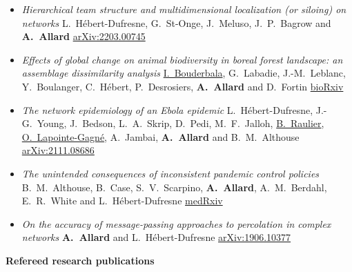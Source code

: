 \documentclass[11pt]{article}
\begin{document}
\begin{itemize}[itemsep=0.5em]
  \item \textit{Hierarchical team structure and multidimensional localization (or siloing) on networks}\split
  L.~Hébert-Dufresne, G.~St-Onge, J.~Meluso, J.~P.~Bagrow and \textbf{A.~Allard}\split
  \href{https://arxiv.org/abs/2203.00745}{arXiv:2203.00745}
%
  \item \textit{Effects of global change on animal biodiversity in boreal forest landscape: an assemblage dissimilarity analysis}\split
  \uline{I.~Bouderbala}, G.~Labadie, J.-M.~Leblanc, Y.~Boulanger, C.~Hébert, P.~Desrosiers, \textbf{A.~Allard} and D.~Fortin\split
  \href{https://doi.org/10.1101/2022.01.31.477297}{bioRxiv}
%
  \item \textit{The network epidemiology of an Ebola epidemic}\split
  L.~Hébert-Dufresne, J.-G.~Young, J.~Bedson, L.~A.~Skrip, D.~Pedi, M.~F.~Jalloh, \uline{B.~Raulier}, \uline{O.~Lapointe-Gagné}, A.~Jambai, \textbf{A.~Allard} and B.~M.~Althouse\split
  \href{https://arxiv.org/abs/2111.08686}{arXiv:2111.08686}
%
  \item \textit{The unintended consequences of inconsistent pandemic control policies}\split
  B.~M.~Althouse, B.~Case, S.~V.~Scarpino, \textbf{A.~Allard}, A.~M.~Berdahl, E.~R.~White and L.~Hébert-Dufresne\split
  \href{https://doi.org/10.1101/2020.08.21.20179473}{medRxiv}
%
  \item \textit{On the accuracy of message-passing approaches to percolation in complex networks}\split
  \textbf{A.~Allard} and L.~H\'ebert-Dufresne\split
  \href{https://arxiv.org/abs/1906.10377}{arXiv:1906.10377}
%
\end{itemize}
%
%
%
\textbf{Refereed research publications}
%
\end{document}
